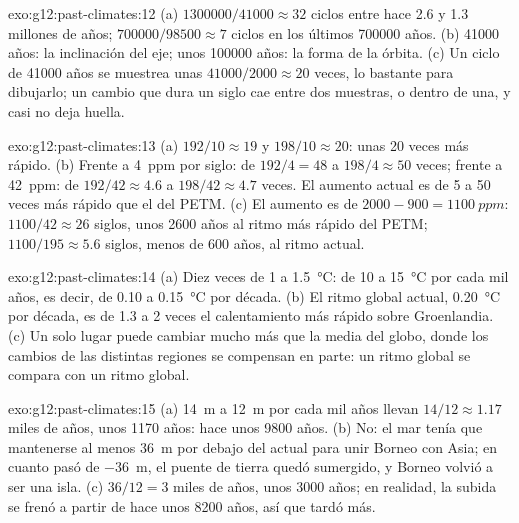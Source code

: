 \begin{solution}{exo:g12:past-climates:12}
(a) $\num{1300000}/\num{41000} \approx 32$ ciclos entre hace 2.6 y 1.3
millones de años; $\num{700000}/\num{98500} \approx 7$ ciclos en los últimos
\num{700000} años. (b) \num{41000} años: la inclinación del eje; unos
\num{100000} años: la forma de la órbita. (c) Un ciclo de \num{41000} años
se muestrea unas $\num{41000}/\num{2000} \approx 20$ veces, lo bastante para dibujarlo;
un cambio que dura un siglo cae entre dos muestras, o dentro de una, y
casi no deja huella.
\end{solution}

\begin{solution}{exo:g12:past-climates:13}
(a) $192/10 \approx 19$ y $198/10 \approx 20$: unas 20 veces más rápido.
(b) Frente a \qty{4}{ppm} por siglo: de $192/4 = 48$ a $198/4 \approx 50$
veces; frente a \qty{42}{ppm}: de $192/42 \approx 4.6$ a $198/42 \approx 4.7$
veces. El aumento actual es de 5 a 50 veces más rápido que el del PETM.
(c) El aumento es de $2000 - 900 = \qty{1100}{ppm}$: $1100/42 \approx 26$ siglos,
unos \num{2600} años al ritmo más rápido del PETM; $1100/195 \approx 5.6$
siglos, menos de 600 años, al ritmo actual.
\end{solution}

\begin{solution}{exo:g12:past-climates:14}
(a) Diez veces de 1 a \qty{1.5}{\degreeCelsius}: de 10 a \qty{15}{\degreeCelsius}
por cada mil años, es decir, de 0.10 a \qty{0.15}{\degreeCelsius} por década.
(b) El ritmo global actual, \qty{0.20}{\degreeCelsius} por década, es de 1.3 a 2
veces el calentamiento más rápido sobre Groenlandia. (c) Un solo lugar puede cambiar mucho
más que la media del globo, donde los cambios de las distintas regiones se
compensan en parte: un ritmo global se compara con un ritmo global.
\end{solution}

\begin{solution}{exo:g12:past-climates:15}
(a) \qty{14}{m} a \qty{12}{m} por cada mil años llevan $14/12 \approx
1.17$ miles de años, unos \num{1170} años: hace unos \num{9800} años.
(b) No: el mar tenía que mantenerse al menos \qty{36}{m} por debajo del actual para unir
Borneo con Asia; en cuanto pasó de \qty{-36}{m}, el puente de tierra quedó sumergido, y
Borneo volvió a ser una isla. (c) $36/12 = 3$ miles de años, unos
\num{3000} años; en realidad, la subida se frenó a partir de hace unos \num{8200} años,
así que tardó más.
\end{solution}

